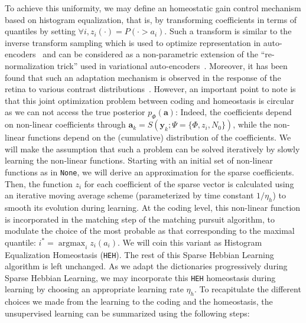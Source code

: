 \documentclass[letterpaper,final,conference,10pt]{IEEEtran}
\newcommand{\citep}[1]{\cite{#1}}
\DeclareMathOperator*{\ArgMax}{\arg\max}   %
\newcommand{\coef}{\mathbf{a}} %
\newcommand{\image}{\mathbf{y}} %
\newcommand{\dico}{\Phi} %
\begin{document}
To achieve this uniformity, we may define an homeostatic gain control mechanism based on histogram equalization, that is, by transforming coefficients in terms of quantiles by setting $\forall i, z_i(\cdot) = P( \cdot > a_i)$. Such a transform is similar to the inverse transform sampling which is used to optimize representation in auto-encoders~\citep{Doersch2016} and can be considered as a non-parametric extension of the ``re-normalization trick'' used in variational auto-encoders~\citep{Kingma13}. %
Moreover, it has been found that such an adaptation mechanism is observed in the response of the retina to various contrast distributions~\citep{Laughlin81}. However, an important point to note is that this joint optimization problem between coding and homeostasis is circular as we can not access the true posterior $p_\dico(\coef)$: Indeed, the coefficients depend on non-linear coefficients through $\coef_{k} = S(\image_k; \Psi=\{\dico, z_i, N_0\})$, while the non-linear functions depend on the (cumulative) distribution of the coefficients. We will make the assumption that such a problem can be solved iteratively by slowly learning the non-linear functions. Starting with an initial set of non-linear functions as in \texttt{None}, we will derive an approximation for the sparse coefficients. Then, the function $z_i$ for each coefficient of the sparse vector is calculated using an iterative moving average scheme (parameterized by time constant $1/\eta_h$) to smooth its evolution during learning. At the coding level, this non-linear function is incorporated in the matching step of the matching pursuit algorithm, to modulate the choice of the most probable as that corresponding to the maximal quantile: $i^\ast = \ArgMax_i z_i(a_i)$. We will coin this variant as Histogram Equalization Homeostasis (\texttt{HEH}). The rest of this Sparse Hebbian Learning algorithm is left unchanged. As we adapt the dictionaries progressively during Sparse Hebbian Learning, we may incorporate this \texttt{HEH} homeostasis during learning by choosing an appropriate learning rate $\eta_h$.
To recapitulate the different choices we made from the learning to the coding and the homeostasis, the unsupervised learning can be summarized using the following steps:
\end{document}
